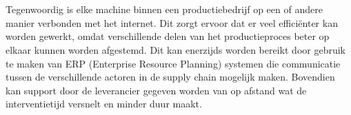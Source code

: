 
%
%
%
%
%

%



\chapter*{}

Tegenwoordig is elke machine binnen een productiebedrijf op een of andere manier verbonden met het internet. Dit zorgt ervoor dat er veel efficiënter kan worden gewerkt, omdat verschillende delen van het productieproces beter op elkaar kunnen worden afgestemd. Dit kan enerzijds worden bereikt door gebruik te maken van ERP (Enterprise Resource Planning) systemen die communicatie tussen de verschillende actoren in de supply chain mogelijk maken. Bovendien kan support door de leverancier gegeven worden van op afstand wat de interventietijd versnelt en minder duur maakt.

